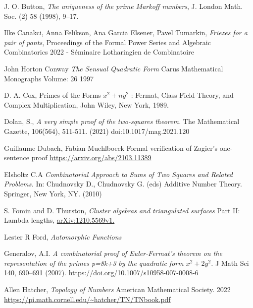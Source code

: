 \documentclass[12pt,a4paper]{amsart}
\begin{document}

J. O. Button, 
\textit{The uniqueness of the prime Markoff numbers},
 J. London Math. Soc.
(2) 58 (1998), 9–17.

Ilke Canakci, Anna Felikson, Ana Garcia Elsener, Pavel Tumarkin,
\textit{Friezes for a pair of pants},
Proceedings of the Formal Power Series and Algebraic Combinatorics 2022 - Séminaire Lotharingien de Combinatoire

John Horton Conway
\textit{The Sensual Quadratic Form}
Carus Mathematical Monographs
Volume: 26
1997

 D. A. Cox, Primes of the Forms $x^2 + ny^2$
: Fermat, Class Field Theory, and
Complex Multiplication, John Wiley, New York, 1989.

Dolan, S., 
\textit{A very simple proof of the two-squares theorem.}
The Mathematical Gazette, 106(564), 511-511. (2021) doi:10.1017/mag.2021.120

Guillaume Dubach, Fabian Muehlboeck
Formal verification of Zagier's one-sentence proof
\url{https://arxiv.org/abs/2103.11389}

Elsholtz C.A 
\textit{Combinatorial Approach to Sums of Two Squares and Related Problems.}
 In: Chudnovsky D., Chudnovsky G. (eds) Additive Number Theory. Springer, New York, NY.
 (2010) 

S. Fomin and D. Thurston,
\textit{Cluster algebras and triangulated surfaces}
Part II: Lambda lengths, \url{arXiv:1210.5569v1.}

Lester R Ford,
\textit{Automorphic Functions}

Generalov, A.I. 
\textit{A combinatorial proof of Euler-Fermat’s theorem on the representation of the primes p=8k+3 by the quadratic
form $x^2 + 2y^2$. }
J Math Sci 140, 690–691 (2007). https://doi.org/10.1007/s10958-007-0008-6


Allen Hatcher, 
\textit{Topology of Numbers} 
American Mathematical Society.
2022
\url{https://pi.math.cornell.edu/~hatcher/TN/TNbook.pdf}
\end{document}
